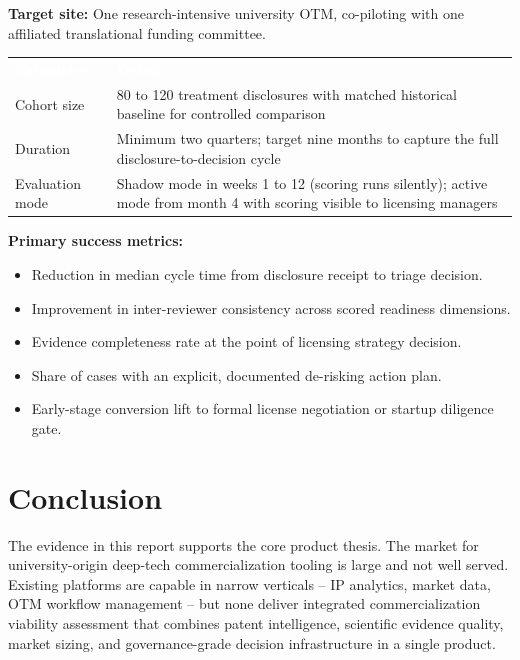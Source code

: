 \documentclass[11pt]{article}
\renewcommand{\arraystretch}{1.60}
\begin{document}
\textbf{Target site:} One research-intensive university OTM, co-piloting with one
affiliated translational funding committee.

\vspace{6pt}

\renewcommand{\arraystretch}{1.6}
\begin{tabularx}{\linewidth}{L{3.6cm} X}
  \textcolor{white}{\textbf{Parameter}} &
  \textcolor{white}{\textbf{Detail}} \\

  Cohort size &
  80 to 120 treatment disclosures with matched historical baseline for
  controlled comparison \\

  Duration &
  Minimum two quarters; target nine months to capture the full
  disclosure-to-decision cycle \\

  Evaluation mode &
  Shadow mode in weeks 1 to 12 (scoring runs silently); active mode from
  month 4 with scoring visible to licensing managers \\[4pt]
\end{tabularx}
\renewcommand{\arraystretch}{1.60}

\vspace{10pt}
\textbf{Primary success metrics:}
\begin{itemize}
  \item Reduction in median cycle time from disclosure receipt to triage decision.
  \item Improvement in inter-reviewer consistency across scored readiness
        dimensions.
  \item Evidence completeness rate at the point of licensing strategy decision.
  \item Share of cases with an explicit, documented de-risking action plan.
  \item Early-stage conversion lift to formal license negotiation or startup
        diligence gate.
\end{itemize}

\section{Conclusion}

The evidence in this report supports the core product thesis. The market for
university-origin deep-tech commercialization tooling is large and not well
served. Existing platforms are capable in narrow verticals -- IP analytics,
market data, OTM workflow management -- but none deliver integrated
commercialization viability assessment that combines patent intelligence,
scientific evidence quality, market sizing, and governance-grade decision
infrastructure in a single product.
\end{document}
